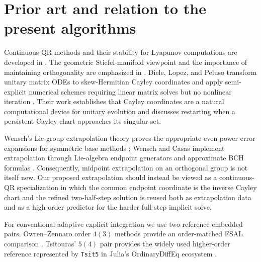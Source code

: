 \documentclass[11pt]{article}
\begin{document}
\section{Prior art and relation to the present algorithms}
Continuous QR methods and their stability for Lyapunov computations are developed in \cite{DieciRussellVanVleck1997}. The geometric Stiefel-manifold viewpoint and the importance of maintaining orthogonality are emphasized in \cite{BridgesReich2001}. Diele, Lopez, and Peluso transform unitary matrix ODEs to skew-Hermitian Cayley coordinates and apply semi-explicit numerical schemes requiring linear matrix solves but no nonlinear iteration \cite{DieleLopezPeluso1998}. Their work establishes that Cayley coordinates are a natural computational device for unitary evolution and discusses restarting when a persistent Cayley chart approaches its singular set.

Wensch's Lie-group extrapolation theory proves the appropriate even-power error expansions for symmetric base methods \cite{Wensch2001}; Wensch and Casas implement extrapolation through Lie-algebra endpoint generators and approximate BCH formulas \cite{WenschCasas2002}. Consequently, midpoint extrapolation on an orthogonal group is not itself new. Our proposed extrapolation should instead be viewed as a continuous-QR specialization in which the common endpoint coordinate is the inverse Cayley chart and the refined two-half-step solution is reused both as extrapolation data and as a high-order predictor for the harder full-step implicit solve.

For conventional adaptive explicit integration we use two reference embedded pairs. Owren--Zennaro order $4(3)$ methods provide an order-matched FSAL comparison \cite{OwrenZennaro1992}. Tsitouras' $5(4)$ pair provides the widely used higher-order reference represented by \texttt{Tsit5} in Julia's OrdinaryDiffEq ecosystem \cite{Tsitouras2011}.
\end{document}

